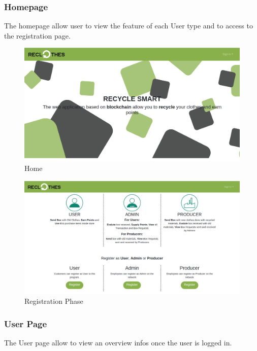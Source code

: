 {\subsubsection{Homepage}

The homepage allow user to view the feature of each User type and to access to the registration page.

\begin{figure}[h!]
    \centering
    \includegraphics[totalheight=7.5cm]{img/dapp/home1.png}
    \caption{Home}
    \label{fig:home}
\end{figure}

\begin{figure}[h!]
    \centering
    \includegraphics[totalheight=7.5cm]{img/dapp/home2.png}
    \caption{Registration Phase}
    \label{fig:registration}
\end{figure}

\subsubsection{User Page}

The User page allow to view an overview infos once the user is logged in. 

}
